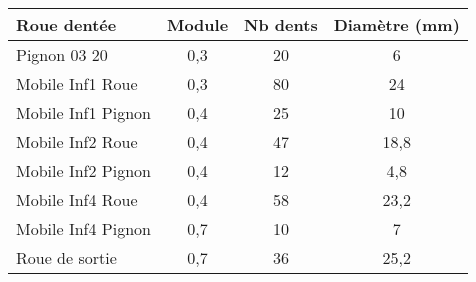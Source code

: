 \ifprof~\\
\begin{center}
\begin{tabular}{lccc}
\hline
\textbf{Roue dentée} & \textbf{Module} & \textbf{Nb dents} & \textbf{Diamètre (mm)}\\
\hline
Pignon 03 20 & 0,3 &20        & 6		\\ 
Mobile Inf1 Roue & 0,3 & 80  & 24 	\\ 
Mobile Inf1 Pignon & 0,4 & 25 & 10	\\ 
Mobile Inf2 Roue & 0,4 & 47   & 18,8	\\ 
Mobile Inf2 Pignon & 0,4 & 12 & 4,8	\\ 
Mobile Inf4 Roue & 0,4 & 58   & 23,2	\\ 
Mobile Inf4 Pignon & 0,7 & 10 & 7	\\  
Roue de sortie & 0,7 & 36      & 25,2 \\ \hline
\end{tabular}
\end{center}
\else
\fi

%
%
%

